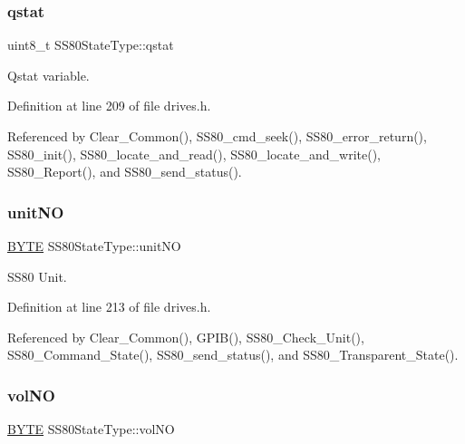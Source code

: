 \subsubsection{\texorpdfstring{qstat}{qstat}}
{\footnotesize\ttfamily uint8\+\_\+t S\+S80\+State\+Type\+::qstat}



Qstat variable. 



Definition at line 209 of file drives.\+h.



Referenced by Clear\+\_\+\+Common(), S\+S80\+\_\+cmd\+\_\+seek(), S\+S80\+\_\+error\+\_\+return(), S\+S80\+\_\+init(), S\+S80\+\_\+locate\+\_\+and\+\_\+read(), S\+S80\+\_\+locate\+\_\+and\+\_\+write(), S\+S80\+\_\+\+Report(), and S\+S80\+\_\+send\+\_\+status().

\mbox{\label{structSS80StateType_ad2b3cd5353f5650df931520a39b385e7}} 
\subsubsection{\texorpdfstring{unit\+NO}{unitNO}}
{\footnotesize\ttfamily \hyperlink{ff_8h_a4ae1dab0fb4b072a66584546209e7d58}{B\+Y\+TE} S\+S80\+State\+Type\+::unit\+NO}



S\+S80 Unit. 



Definition at line 213 of file drives.\+h.



Referenced by Clear\+\_\+\+Common(), G\+P\+I\+B(), S\+S80\+\_\+\+Check\+\_\+\+Unit(), S\+S80\+\_\+\+Command\+\_\+\+State(), S\+S80\+\_\+send\+\_\+status(), and S\+S80\+\_\+\+Transparent\+\_\+\+State().

\mbox{\label{structSS80StateType_ac197866db7677ec4bf9ad5e29e4a58a3}} 
\subsubsection{\texorpdfstring{vol\+NO}{volNO}}
{\footnotesize\ttfamily \hyperlink{ff_8h_a4ae1dab0fb4b072a66584546209e7d58}{B\+Y\+TE} S\+S80\+State\+Type\+::vol\+NO}



